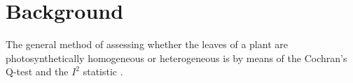 \documentclass{bioinfo}
\begin{document}
%
%
%


\vspace{-0.2in}
\section{Background}
The general method of assessing whether the leaves of a plant are photosynthetically homogeneous or heterogeneous is by means of the Cochran's Q-test \citep{conover1999Practical} and the $I^2$ statistic \citep{higgins2002quantifying,higgins2003measuring}. %
%
%
%








\end{document}

